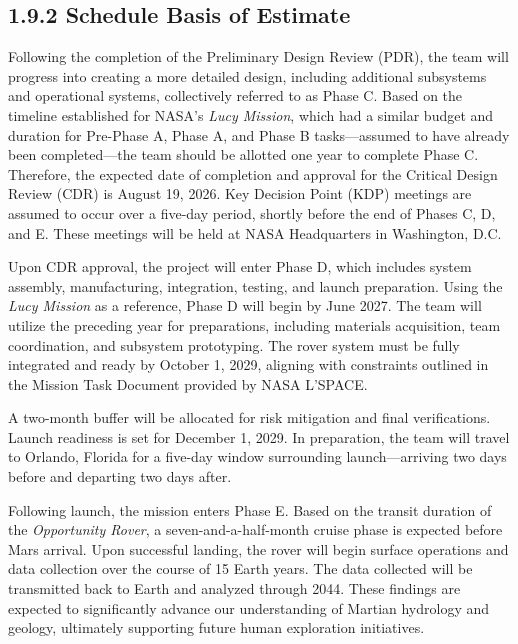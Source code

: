 \subsection*{1.9.2 Schedule Basis of Estimate}

Following the completion of the Preliminary Design Review (PDR), the team will progress into creating a more detailed design, including additional subsystems and operational systems, collectively referred to as Phase C. Based on the timeline established for NASA’s \textit{Lucy Mission}, which had a similar budget and duration for Pre-Phase A, Phase A, and Phase B tasks—assumed to have already been completed—the team should be allotted one year to complete Phase C. Therefore, the expected date of completion and approval for the Critical Design Review (CDR) is August 19, 2026. Key Decision Point (KDP) meetings are assumed to occur over a five-day period, shortly before the end of Phases C, D, and E. These meetings will be held at NASA Headquarters in Washington, D.C.

Upon CDR approval, the project will enter Phase D, which includes system assembly, manufacturing, integration, testing, and launch preparation. Using the \textit{Lucy Mission} as a reference, Phase D will begin by June 2027. The team will utilize the preceding year for preparations, including materials acquisition, team coordination, and subsystem prototyping. The rover system must be fully integrated and ready by October 1, 2029, aligning with constraints outlined in the Mission Task Document provided by NASA L’SPACE.

A two-month buffer will be allocated for risk mitigation and final verifications. Launch readiness is set for December 1, 2029. In preparation, the team will travel to Orlando, Florida for a five-day window surrounding launch—arriving two days before and departing two days after.

Following launch, the mission enters Phase E. Based on the transit duration of the \textit{Opportunity Rover}, a seven-and-a-half-month cruise phase is expected before Mars arrival. Upon successful landing, the rover will begin surface operations and data collection over the course of 15 Earth years. The data collected will be transmitted back to Earth and analyzed through 2044. These findings are expected to significantly advance our understanding of Martian hydrology and geology, ultimately supporting future human exploration initiatives.